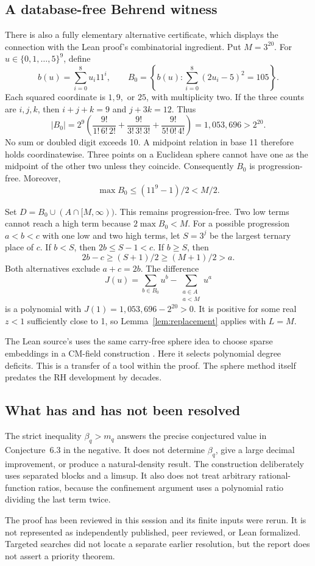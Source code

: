 \subsection{A database-free Behrend witness}

There is also a fully elementary alternative certificate, which displays
the connection with the Lean proof's combinatorial ingredient. Put
\(M=3^{20}\). For \(u\in\{0,1,\ldots,5\}^9\), define
\[
 b(u)=\sum_{i=0}^{8}u_i11^i,\qquad
 B_0=\left\{b(u):\sum_{i=0}^{8}(2u_i-5)^2=105\right\}.
\]
Each squared coordinate is \(1,9,\) or \(25\), with multiplicity two.
If the three counts are \(i,j,k\), then \(i+j+k=9\) and \(j+3k=12\).
Thus
\[
 |B_0|=2^9\left(
 \frac{9!}{1!\,6!\,2!}+\frac{9!}{3!\,3!\,3!}
                    +\frac{9!}{5!\,0!\,4!}\right)
 =1{,}053{,}696>2^{20}.
\]
No sum or doubled digit exceeds 10. A midpoint relation in base 11
therefore holds coordinatewise. Three points on a Euclidean sphere cannot
have one as the midpoint of the other two unless they coincide.
Consequently \(B_0\) is progression-free. Moreover,
\[
 \max B_0\le(11^9-1)/2<M/2.
\]

Set \(D=B_0\cup(A\cap[M,\infty))\). This remains progression-free.
Two low terms cannot reach a high term because \(2\max B_0<M\).
For a possible progression \(a<b<c\) with one low and two high terms,
let \(S=3^j\) be the largest ternary place of \(c\). If \(b<S\),
then \(2b\le S-1<c\). If \(b\ge S\), then
\[
 2b-c\ge(S+1)/2\ge(M+1)/2>a.
\]
Both alternatives exclude \(a+c=2b\). The difference
\[
 J(u)=\sum_{b\in B_0}u^b-\sum_{\substack{a\in A\\a<M}}u^a
\]
is a polynomial with \(J(1)=1{,}053{,}696-2^{20}>0\).
It is positive for some real \(z<1\) sufficiently close to 1, so
Lemma~\ref{lem:replacement} applies with \(L=M\).

The Lean source's  uses the same carry-free
sphere idea to choose sparse embeddings in a CM-field construction
\cite{behrend,repo}. Here it selects polynomial degree deficits.
This is a transfer of a tool within the proof. The sphere method itself
predates the RH development by decades.

\subsection{What has and has not been resolved}

The strict inequality \(\beta_q>m_q\) answers the precise conjectured value
in Conjecture~6.3 in the negative. It does not determine \(\beta_q\), give a
large decimal improvement, or produce a natural-density result. The
construction deliberately uses separated blocks and a limsup. It also
does not treat arbitrary rational-function ratios, because the confinement
argument uses a polynomial ratio dividing the last term twice.

The proof has been reviewed in this session and its finite inputs were
rerun. It is not represented as independently published, peer reviewed,
or Lean formalized. Targeted searches did not locate a separate earlier
resolution, but the report does not assert a priority theorem.
